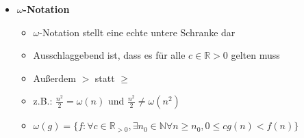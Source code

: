 \documentclass[
    ngerman,
    color=3b,
    load_common, %
    summary,
    boxarc,
]{tuda_summary}
\begin{document}
\begin{itemize}
    \item \textbf{$\omega$-Notation}
          \begin{itemize}
              \item $\omega$-Notation stellt eine echte untere Schranke dar
              \item Ausschlaggebend ist, dass es für alle $c \in \mathbb{R}{>0}$ gelten muss
              \item Au\ss erdem $>$ statt $\geq$
              \item z.B.: $\frac{n^2}{2} = \omega(n)$ und $\frac{n^2}{2} \neq \omega(n^2)$
              \item[] %
                    $\omega(g)=\{f:\forall c \in \mathbb{R}_{>0},\exists n_0 \in \mathbb{N} \forall n \geq n_0,0\leq cg(n)<f(n)\}$
          \end{itemize}
\end{itemize}
\clearpage
\end{document}
